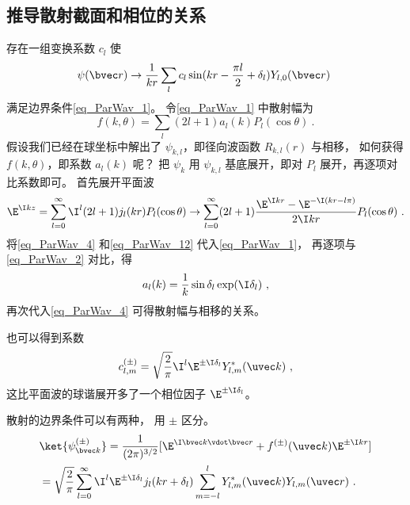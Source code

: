 \subsection{推导散射截面和相位的关系}
存在一组变换系数 $c_l$ 使
\begin{equation}\label{eq_ParWav_2}
\psi(\bvec r) \rightarrow \frac{1}{kr} \sum_l c_l \sin(kr - \frac{\pi l}{2} + \delta_l) Y_{l,0}(\bvec r)~
\end{equation}
满足边界条件\autoref{eq_ParWav_1}。 令\autoref{eq_ParWav_1} 中散射幅为
\begin{equation}\label{eq_ParWav_4}
f(k,\theta) = \sum_l (2l + 1) a_l(k) P_l(\cos \theta)~.
\end{equation}
假设我们已经在球坐标中解出了 $\psi_{k,l}$，即径向波函数 $R_{k,l}(r)$ 与相移， 如何获得 $f(k,\theta )$，即系数 $a_l(k)$ 呢？ 把 $\psi_k$ 用 $\psi_{k,l}$ 基底展开，即对 $P_l$ 展开，再逐项对比系数即可。 首先展开平面波
\begin{equation}\label{eq_ParWav_12}
\E^{\I kz} = \sum_{l = 0}^\infty  \I^l (2l + 1) j_l(kr) P_l(\cos \theta) \rightarrow \sum_{l=0}^\infty  (2l + 1)\frac{\E^{\I kr} - \E^{-\I(kr - l\pi)}}{2\I kr} P_l(\cos \theta)~.
\end{equation}
将\autoref{eq_ParWav_4} 和\autoref{eq_ParWav_12} 代入\autoref{eq_ParWav_1}， 再逐项与\autoref{eq_ParWav_2} 对比，得
\begin{equation}
a_l(k) = \frac{1}{k} \sin\delta_l \exp(\I \delta_l)~,
\end{equation}
再次代入\autoref{eq_ParWav_4} 可得散射幅与相移的关系。

也可以得到系数
\begin{equation}
c_{l,m}^{(\pm)} = \sqrt{\frac{2}{\pi}} \I^l \E^{\pm \I \delta_l} Y_{l,m}^*(\uvec k)~,
\end{equation}
这比平面波的球谐展开多了一个相位因子 $\E^{\pm \I \delta_l}$。

散射的边界条件可以有两种， 用 $\pm$ 区分。
\begin{equation}
\begin{aligned}
&\ket{\psi_{\bvec k}^{(\pm)}} = \frac{1}{(2\pi)^{3/2}}[\E^{\I \bvec k \vdot \bvec r} + f^{(\pm)}(\uvec k)\E^{\pm\I kr}]\\
&= \sqrt{\frac{2}{\pi}} \sum_{l=0}^{\infty} \I^l \E^{\pm\I \delta_l} j_l(kr + \delta_l) \sum_{m=-l}^l Y_{l,m}^*(\uvec k) Y_{l,m}(\uvec r)~.
\end{aligned}
\end{equation}

